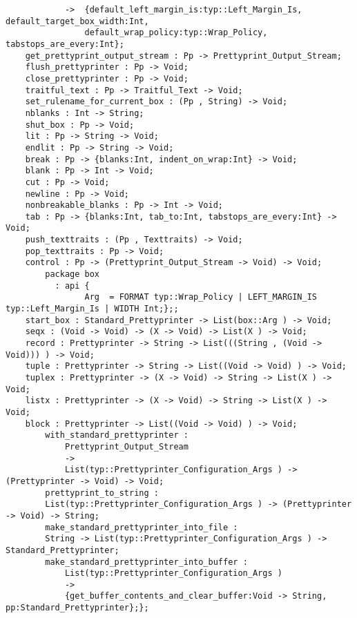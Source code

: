 \begin{verbatim}
            ->  {default_left_margin_is:typ::Left_Margin_Is, default_target_box_width:Int,
                default_wrap_policy:typ::Wrap_Policy, tabstops_are_every:Int};
    get_prettyprint_output_stream : Pp -> Prettyprint_Output_Stream;
    flush_prettyprinter : Pp -> Void;
    close_prettyprinter : Pp -> Void;
    traitful_text : Pp -> Traitful_Text -> Void;
    set_rulename_for_current_box : (Pp , String) -> Void;
    nblanks : Int -> String;
    shut_box : Pp -> Void;
    lit : Pp -> String -> Void;
    endlit : Pp -> String -> Void;
    break : Pp -> {blanks:Int, indent_on_wrap:Int} -> Void;
    blank : Pp -> Int -> Void;
    cut : Pp -> Void;
    newline : Pp -> Void;
    nonbreakable_blanks : Pp -> Int -> Void;
    tab : Pp -> {blanks:Int, tab_to:Int, tabstops_are_every:Int} -> Void;
    push_texttraits : (Pp , Texttraits) -> Void;
    pop_texttraits : Pp -> Void;
    control : Pp -> (Prettyprint_Output_Stream -> Void) -> Void;
        package box
          : api {
                Arg  = FORMAT typ::Wrap_Policy | LEFT_MARGIN_IS typ::Left_Margin_Is | WIDTH Int;};;
    start_box : Standard_Prettyprinter -> List(box::Arg ) -> Void;
    seqx : (Void -> Void) -> (X -> Void) -> List(X ) -> Void;
    record : Prettyprinter -> String -> List(((String , (Void -> Void))) ) -> Void;
    tuple : Prettyprinter -> String -> List((Void -> Void) ) -> Void;
    tuplex : Prettyprinter -> (X -> Void) -> String -> List(X ) -> Void;
    listx : Prettyprinter -> (X -> Void) -> String -> List(X ) -> Void;
    block : Prettyprinter -> List((Void -> Void) ) -> Void;
        with_standard_prettyprinter :
            Prettyprint_Output_Stream
            ->
            List(typ::Prettyprinter_Configuration_Args ) -> (Prettyprinter -> Void) -> Void;
        prettyprint_to_string :
        List(typ::Prettyprinter_Configuration_Args ) -> (Prettyprinter -> Void) -> String;
        make_standard_prettyprinter_into_file :
        String -> List(typ::Prettyprinter_Configuration_Args ) -> Standard_Prettyprinter;
        make_standard_prettyprinter_into_buffer :
            List(typ::Prettyprinter_Configuration_Args )
            ->
            {get_buffer_contents_and_clear_buffer:Void -> String, pp:Standard_Prettyprinter};};
\end{verbatim}
